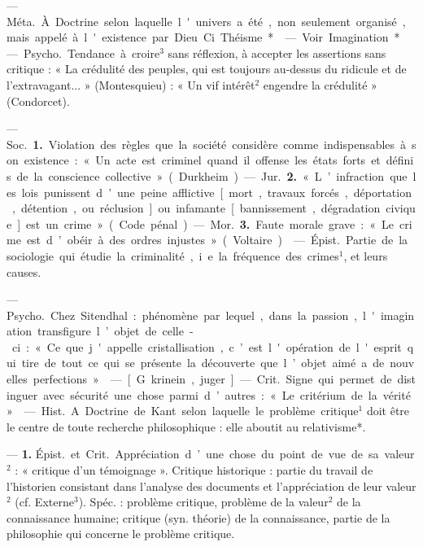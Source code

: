\begin{itemize}[leftmargin=1cm, label=, itemsep=11pt]
 — \si{Méta.} À Doctrine
selon laquelle l'univers a été, non
seulement organisé, mais appelé à
l'existence par Dieu. Ci. Théisme*.

— Voir Imagination*.

 — \si{Psycho.} Tendance à
croire$^3$ sans réflexion, à accepter les
assertions sans critique : « La crédulité des peuples, qui est toujours au-dessus du ridicule et de l’extravagant... » (Montesquieu) : « Un vif
intérêt$^2$ engendre la crédulité »
(Condorcet).

 — \si{Soc.} {\bf 1.} Violation des règles
que la société considère comme
indispensables à son existence : « Un
acte est criminel quand il offense les
états forts et définis de la conscience
collective » (Durkheim). — \si{Jur.}
 {\bf 2.} « L’infraction que les lois punissent d’une peine afflictive [mort,
travaux forcés, déportation, détention, ou réclusion] ou infamante
[bannissement, dégradation civique]
est un crime » (Code pénal).

— \si{Mor.}  {\bf 3.} Faute morale grave :
« Le crime est d’obéir à des ordres
injustes » (Voltaire).

 — \si{Épist.} Partie de la
sociologie qui étudie la criminalité,
i. e. la fréquence des crimes$^1$, et leurs
causes.

 — \si{Psycho.} Chez Sitendhal : phénomène par lequel, dans
la passion, l'imagination transfigure
l’objet de celle-ci : « Ce que j'appelle
cristallisation, c’est l'opération de
l'esprit qui tire de tout ce qui se
présente la découverte que l’objet
aimé a de nouvelles perfections. »

 — [G. krinein, juger] — \si{Crit.}
Signe qui permet de distinguer avec
sécurité une chose parmi d’autres :
« Le critérium de la vérité. »

 — \si{Hist.} A. Doctrine de
Kant selon laquelle le problème
critique$^1$ doit être le centre de toute
recherche philosophique : elle aboutit
au relativisme*.

 — {\bf 1.} \si{Épist.} et \si{Crit.} Appréciation d’une chose du point de vue
de sa valeur$^2$ : « critique d’un témoignage ». Critique historique : partie
du travail de l'historien consistant
dans l'analyse des documents et
l'appréciation de leur valeur$^2$ (cf.
Externe$^3$). Spéc. : problème critique,
problème de la valeur$^2$ de la connaissance humaine; critique (syn.
théorie) de la connaissance, partie de
la philosophie qui concerne le problème critique.


\end{itemize}
